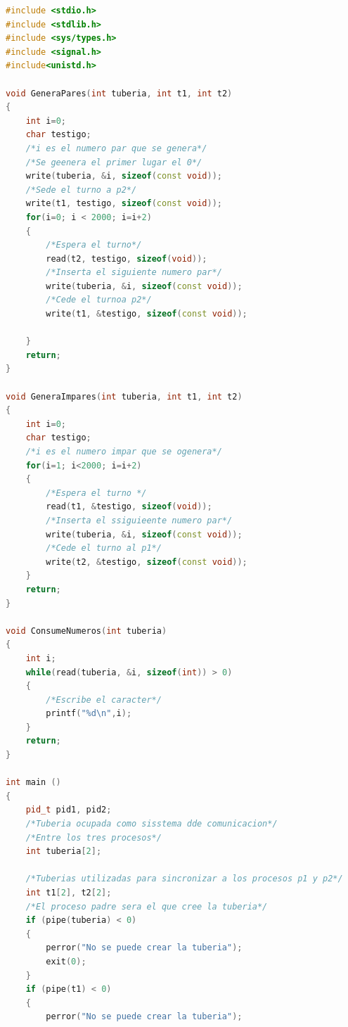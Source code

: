 \documentclass[11pt,a4paper]{report}
\begin{document}
\begin{lstlisting}[language=C++, caption={Ejemtub1}]
#include <stdio.h>
#include <stdlib.h>
#include <sys/types.h>
#include <signal.h>
#include<unistd.h>

void GeneraPares(int tuberia, int t1, int t2)
{
	int i=0;
	char testigo;
	/*i es el numero par que se genera*/
	/*Se geenera el primer lugar el 0*/
	write(tuberia, &i, sizeof(const void));
	/*Sede el turno a p2*/
	write(t1, testigo, sizeof(const void));
	for(i=0; i < 2000; i=i+2)
	{
		/*Espera el turno*/
		read(t2, testigo, sizeof(void));
		/*Inserta el siguiente numero par*/
		write(tuberia, &i, sizeof(const void));
		/*Cede el turnoa p2*/
		write(t1, &testigo, sizeof(const void));

	}
	return;
}

void GeneraImpares(int tuberia, int t1, int t2)
{
	int i=0;
	char testigo;
	/*i es el numero impar que se ogenera*/
	for(i=1; i<2000; i=i+2)
	{
		/*Espera el turno */
		read(t1, &testigo, sizeof(void));
		/*Inserta el ssiguieente numero par*/
		write(tuberia, &i, sizeof(const void));
		/*Cede el turno al p1*/
		write(t2, &testigo, sizeof(const void));
	}
	return;
}

void ConsumeNumeros(int tuberia)
{
	int i;
	while(read(tuberia, &i, sizeof(int)) > 0)
	{
		/*Escribe el caracter*/
		printf("%d\n",i);
	}
	return;
}

int main ()
{
	pid_t pid1, pid2;
	/*Tuberia ocupada como sisstema dde comunicacion*/
	/*Entre los tres procesos*/
	int tuberia[2];

	/*Tuberias utilizadas para sincronizar a los procesos p1 y p2*/
	int t1[2], t2[2];
	/*El proceso padre sera el que cree la tuberia*/
	if (pipe(tuberia) < 0)
	{
		perror("No se puede crear la tuberia");
		exit(0);
	}
	if (pipe(t1) < 0)
	{
		perror("No se puede crear la tuberia");


\end{lstlisting}
\end{document}
